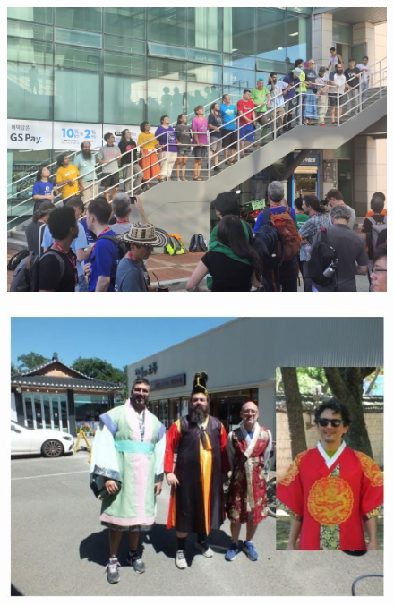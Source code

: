 \documentclass{beamer}
\begin{document}
\begin{frame}
	\begin{figure}
		\centering
		\includegraphics[width=1\linewidth]{images/comunidad.jpg}
		\label{fig:debian}
	\end{figure}
\end{frame}


\begin{frame}
	\begin{figure}
		\centering
		\includegraphics[width=1\linewidth]{images/developers.jpeg}
		\label{fig:debian}
	\end{figure}
\end{frame}
\end{document}
